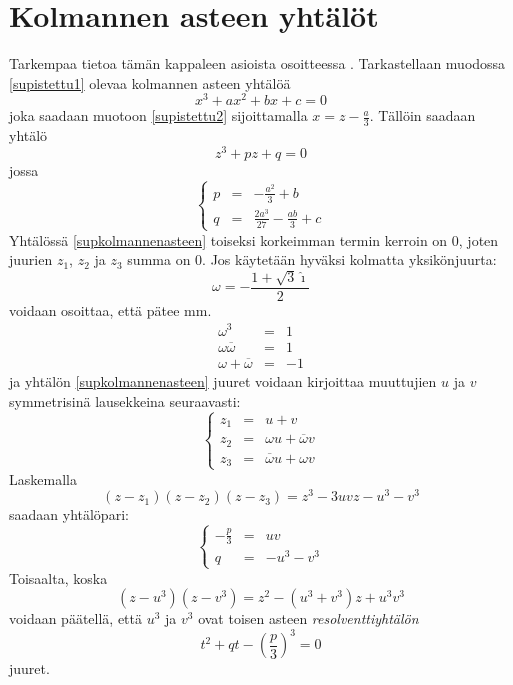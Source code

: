 \documentclass[a4paper,12pt,twoside]{article}
\begin{document}
\section{Kolmannen asteen yhtälöt}
Tarkempaa tietoa tämän kappaleen asioista osoitteessa \cite{Wei1}. Tarkastellaan muodossa \ref{supistettu1} olevaa kolmannen asteen yhtälöä
$$
x^3+ax^2+bx+c=0
$$
joka saadaan muotoon \ref{supistettu2} sijoittamalla $x=z-\frac{a}{3}$. Tällöin saadaan yhtälö
\begin{equation}
\label{supkolmannenasteen}
z^3+pz+q=0
\end{equation}
jossa
$$
\left\{
\begin{array}{ccc}
  p & = & -\frac{a^2}{3}+b \\
  q & = & \frac{2a^3}{27}-\frac{ab}{3}+c
\end{array}
\right.
$$
Yhtälössä \ref{supkolmannenasteen} toiseksi korkeimman termin kerroin on 0, joten juurien $z_1$, $z_2$ ja $z_3$ summa on 0. Jos käytetään hyväksi kolmatta yksikönjuurta:
$$
\omega=-\frac{1+\sqrt{3}\hat\imath}{2}
$$
voidaan osoittaa, että pätee mm.
\begin{eqnarray*}
  \omega^3 & = & 1 \\
  \omega\overline{\omega} & = & 1 \\
  \omega+\overline{\omega} & = & -1
\end{eqnarray*}
ja yhtälön \ref{supkolmannenasteen} juuret voidaan kirjoittaa muuttujien $u$ ja $v$ symmetrisinä lausekkeina seuraavasti:
\begin{equation}
  \label{kolmjuuret}
\left\{
\begin{array}{ccc}
  z_1 & = & u+v \\
  z_2 & = & \omega u+\overline{\omega} v \\
  z_3 & = & \overline{\omega} u+\omega v
\end{array}
\right.
\end{equation}
Laskemalla
$$
(z-z_1)(z-z_2)(z-z_3)=z^3-3uvz-u^3-v^3
$$
saadaan yhtälöpari:
$$
\left\{
\begin{array}{ccc}
  -\frac{p}{3} & = & uv \\
  q & = & -u^3-v^3
\end{array}
\right.
$$
Toisaalta, koska
$$
(z-u^3)(z-v^3)=z^2-(u^3+v^3)z+u^3 v^3
$$
voidaan päätellä, että $u^3$ ja $v^3$ ovat toisen asteen \emph{resolventtiyhtälön}
\begin{equation}
  \label{kolmresolventti}
t^2+qt-\left(\frac{p}{3}\right)^3=0
\end{equation}
juuret.
\end{document}
